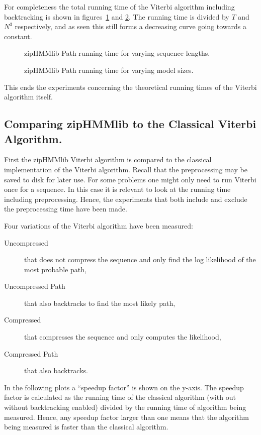 For completeness the total running time of the Viterbi algorithm including
backtracking is shown in figures~\ref{fig:assymptotic_viterbi_path_n} and
\ref{fig:assymptotic_viterbi_path_k}. The running time is divided by $T$ and
$N^3$ respectively, and as seen this still forms a decreasing curve going
towards a constant.

\begin{figure}
  \centering
  
  \caption{zipHMMlib Path running time for varying sequence lengths.}
  \label{fig:assymptotic_viterbi_path_n}
\end{figure}

\begin{figure}
  \centering
  
  \caption{zipHMMlib Path running time for varying model sizes.}
  \label{fig:assymptotic_viterbi_path_k}
\end{figure}

This ends the experiments concerning the theoretical running times of the
Viterbi algorithm itself.

\subsection{Comparing zipHMMlib to the Classical Viterbi Algorithm.}
\label{sec:comp-ziphmml-class}

First the zipHMMlib Viterbi algorithm is compared to the classical
implementation of the Viterbi algorithm. Recall that the preprocessing may be
saved to disk for later use. For some problems one might only need to run
Viterbi once for a sequence. In this case it is relevant to look at the running time
including preprocessing. Hence, the experiments that both include and exclude
the preprocessing time have been made.

Four variations of the Viterbi algorithm have been measured:
\begin{description}
\item[Uncompressed] that does not compress the sequence and only find the log
  likelihood of the most probable path,
\item[Uncompressed Path] that also backtracks to find the most likely path,
\item[Compressed] that compresses the sequence and only computes the
  likelihood,
\item[Compressed Path] that also backtracks.
\end{description}

In the following plots a ``speedup factor'' is shown on the y-axis. The speedup
factor is calculated as the running time of the classical algorithm (with out
without backtracking enabled) divided by the running time of algorithm being
measured. Hence, any speedup factor larger than one means that the algorithm
being measured is faster than the classical algorithm.

